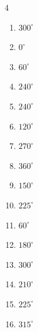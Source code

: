 \begin{multicols}{4}
\begin{enumerate}
  \item $\displaystyle 300^{\circ}$

  \item $\displaystyle 0^{\circ}$
        \phantom{$\displaystyle =0$}

  \item $\displaystyle 60^{\circ}$

  \item $\displaystyle 240^{\circ}$

  \item $\displaystyle 240^{\circ}$

  \item $\displaystyle 120^{\circ}$

  \item $\displaystyle 270^{\circ}$

  \item $\displaystyle 360^{\circ}$
        \phantom{$\displaystyle =2\pi$}

  \item $\displaystyle 150^{\circ}$

  \item $\displaystyle 225^{\circ}$

  \item $\displaystyle 60^{\circ}$

  \item $\displaystyle 180^{\circ}$
        \phantom{$\displaystyle =\pi$}

  \item $\displaystyle 300^{\circ}$

  \item $\displaystyle 210^{\circ}$

  \item $\displaystyle 225^{\circ}$

  \item $\displaystyle 315^{\circ}$


\end{enumerate}
\end{multicols}
